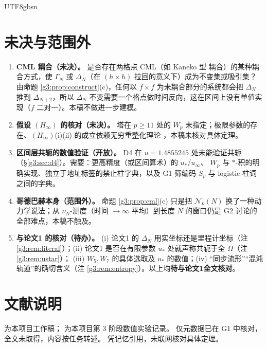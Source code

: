 \documentclass[11pt,a4paper]{article}
\newcommand{\Cnt}{\mathcal N}          %
\newcommand{\Om}{\Omega}               %
\newcommand{\ust}{u_{*}}
\newcommand{\uinf}{u_{\infty}}
\theoremstyle{plain}
\theoremstyle{definition}
\begin{document}
\begin{CJK}{UTF8}{gbsn}
\section{未决与范围外}\label{g3:sec:open}
\begin{enumerate}[leftmargin=*]
\item \textbf{CML 耦合（未决）。} 是否存在两格点 CML（如 Kaneko 型 \cite{Kan84} 耦合）的某种耦合方式，使 $\Gamma_N$ 或 $\Delta_N$（在 $(h\times h)$ 拉回的意义下）成为不变集或吸引集？
由命题 \ref{g3:prop:construct}(c)，任何以 $f\times f$ 为未耦合部分的系统都会把 $\Delta_N$ 推到 $\Delta_{N+2}$，所以 $\Delta_N$ 不变需要一个格点做时间反向，这在区间上没有单值实现（$f$ 二对一）。本稿不做进一步建模。
\item \textbf{假设 $(H_\infty)$ 的核对（未决）。} 塔在 $p\ge11$ 处的 $W_p$ 未指定；极限参数的存在、$(H_\infty)$(i)(ii) 的成立依赖无穷重整化理论 \cite{dMvS93}，本稿未核对具体定理。
\item \textbf{区间层共轭的数值验证（开放）。} D4 在 $u=1.4855245$ 处未能验证共轭（\S\ref{g3:sec:d4}）。需要：更高精度（或区间算术）的 $\ust$/$\uinf$、
$W_p$ 与 $*$-积的明确实现、独立于地址标签的禁止柱字典，以及 G1 筛编码 $S_p$ 与 logistic 柱词之间的字典。
\item \textbf{哥德巴赫本身（范围外）。} 命题 \ref{g3:prop:cml}(c) 只是把 $\Cnt_k(N)$ 换了一种动力学说法；从 $\nu_N$-测度（时间 $\to\infty$ 平均）到长度 $N$ 的窗口仍是 G2 讨论的全部难点，本稿不触及。
\item \textbf{与论文1 的核对（待办）。} (i) 论文1 的 $\Delta_N$ 用实坐标还是里程计坐标（注 \ref{g3:rem:literal}）；(ii) 论文1 是否在有限参数 $\ust$ 处就声称共轭于全 $\Om$（注 \ref{g3:rem:ustar}）；
(iii) $W_5,W_7$ 的具体选取及 $\ust$ 的数值；(iv) “同步流形”“混沌轨道”的确切含义（注 \ref{g3:rem:entropy}）。以上均\textbf{待与论文1全文核对}。
\end{enumerate}

\section*{文献说明}
\cite{G1,G2} 为本项目工作稿；\cite{D4} 为本项目第 3 阶段数值实验记录。\cite{Wang26} 仅元数据已在 G1 中核对，全文未取得，内容按任务转述。
\cite{dMvS93} 凭记忆引用，未联网核对具体定理。


\end{CJK}
\end{document}
